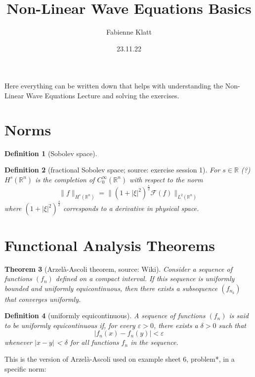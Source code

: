 \documentclass[12pt,a4paper]{article}
\title{Non-Linear Wave Equations Basics}
\author{Fabienne Klatt}
\date{23.11.22}
\newtheorem{definition}{Definition}
\newtheorem{thm}[definition]{Theorem}
\begin{document}
\tableofcontents
\thispagestyle{empty}

\clearpage

Here everything can be written down that helps with understanding the Non-Linear Wave Equations Lecture and solving the exercises.

\section{Norms}

\begin{definition}[Sobolev space]

\end{definition}

\begin{definition}[fractional Sobolev space; source: exercise session 1]
For $s\in\mathbb{R}$ (?) $H^s(\mathbb{R}^n)$ is the completion of $C^{\infty}_0(\mathbb{R}^n)$ with respect to the norm
\begin{equation}
\lVert f \rVert_{H^s(\mathbb{R}^n)}=\lVert (1+\lvert\xi\rvert^2)^{\frac{s}{2}}\mathcal{F}(f)\rVert_{L^2(\mathbb{R}^n)}
\end{equation}
where $(1+\lvert\xi\rvert^2)^{\frac{s}{2}}$ corresponds to a derivative in physical space.
\end{definition}

\section{Functional Analysis Theorems}

\begin{thm}[Arzelà-Ascoli theorem, source: Wiki]
Consider a sequence of functions $(f_n)$ defined on a compact interval. If this sequence is uniformly bounded and uniformly equicontinuous, then there exists a subsequence $(f_{n_k})$ that converges uniformly.
\end{thm}

\begin{definition}[uniformly equicontinuous]
A sequence of functions $(f_n)$ is said to be uniformly equicontinuous if, for every $\varepsilon > 0$, there exists a $\delta > 0$ such that
\begin{equation}
\left|f_{n}(x)-f_{n}(y)\right|<\varepsilon
\end{equation}
whenever $| x-y |$ < $\delta$ for all functions $f_n$ in the sequence.
\end{definition}

This is the version of Arzelà-Ascoli used on example sheet 6, problem*, in a specific norm:
\end{document}
